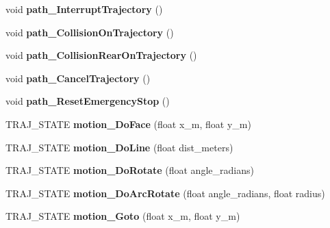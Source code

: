 \begin{DoxyCompactItemize}
\item 
\mbox{\label{classAsservDriver_affc4e315cdd03c826cea17114d02a19c}} 
void {\bfseries path\+\_\+\+Interrupt\+Trajectory} ()
\item 
\mbox{\label{classAsservDriver_a6af616f39706df060f1b81b2047c7a7f}} 
void {\bfseries path\+\_\+\+Collision\+On\+Trajectory} ()
\item 
\mbox{\label{classAsservDriver_a370b2f287b352211c07a023edcb63bc7}} 
void {\bfseries path\+\_\+\+Collision\+Rear\+On\+Trajectory} ()
\item 
\mbox{\label{classAsservDriver_a7f18af77a8524e09f8c9b024d4f0e4b8}} 
void {\bfseries path\+\_\+\+Cancel\+Trajectory} ()
\item 
\mbox{\label{classAsservDriver_aa54769b7bbe83fefa64925aa60089096}} 
void {\bfseries path\+\_\+\+Reset\+Emergency\+Stop} ()
\item 
\mbox{\label{classAsservDriver_a0e3dd8cd0074221327d049f522c35f1e}} 
T\+R\+A\+J\+\_\+\+S\+T\+A\+TE {\bfseries motion\+\_\+\+Do\+Face} (float x\+\_\+m, float y\+\_\+m)
\item 
\mbox{\label{classAsservDriver_a4ac101bd479baeecf76fd0d6be63421d}} 
T\+R\+A\+J\+\_\+\+S\+T\+A\+TE {\bfseries motion\+\_\+\+Do\+Line} (float dist\+\_\+meters)
\item 
\mbox{\label{classAsservDriver_aca1011c3fb10e594e836ea4ada6b92ff}} 
T\+R\+A\+J\+\_\+\+S\+T\+A\+TE {\bfseries motion\+\_\+\+Do\+Rotate} (float angle\+\_\+radians)
\item 
\mbox{\label{classAsservDriver_aabc36af66a38e2fb735e764730328994}} 
T\+R\+A\+J\+\_\+\+S\+T\+A\+TE {\bfseries motion\+\_\+\+Do\+Arc\+Rotate} (float angle\+\_\+radians, float radius)
\item 
\mbox{\label{classAsservDriver_a9ebb6ca2afa63158b2bc3d9e2f5f0412}} 
T\+R\+A\+J\+\_\+\+S\+T\+A\+TE {\bfseries motion\+\_\+\+Goto} (float x\+\_\+m, float y\+\_\+m)
\item 

\end{DoxyCompactItemize}
